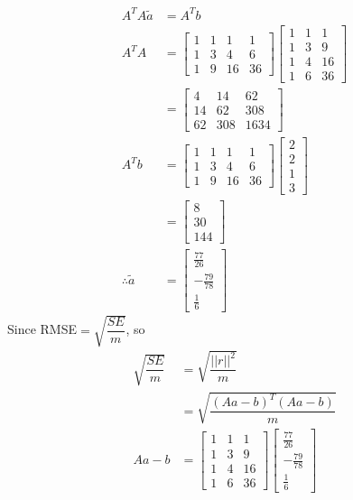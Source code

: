 \documentclass{article}
\begin{document}
\begin{enumerate}
\begin{align*}
A^TA\tilde{a}&=A^Tb\\
A^TA&=\begin{bmatrix}
1&1&1&1\\1&3&4&6\\1&9&16&36
\end{bmatrix}\begin{bmatrix}
1&1&1\\1&3&9\\1&4&16\\1&6&36
\end{bmatrix}\\
&=\begin{bmatrix}
4&14&62\\14&62&308\\62&308&1634
\end{bmatrix}\\
A^Tb&=\begin{bmatrix}
1&1&1&1\\1&3&4&6\\1&9&16&36
\end{bmatrix}\begin{bmatrix}
2\\2\\1\\3
\end{bmatrix}\\&=\begin{bmatrix}
8\\30\\144
\end{bmatrix}\\
\therefore \tilde{a}&=\begin{bmatrix}
\frac{77}{26}\\-\frac{79}{78}\\\frac{1}{6}
\end{bmatrix}
\end{align*}
Since RMSE$ = \sqrt{\dfrac{SE}{m}}$, so \begin{align*}
\sqrt{\dfrac{SE}{m}}&=\sqrt{\dfrac{||r||^2}{m}}\\
&=\sqrt{\dfrac{(Aa-b)^T(Aa-b)}{m}}\\
Aa-b&=\begin{bmatrix}
1&1&1\\1&3&9\\1&4&16\\1&6&36
\end{bmatrix}\begin{bmatrix}
\frac{77}{26}\\-\frac{79}{78}\\\frac{1}{6}

\end{bmatrix}
\end{align*}
\end{enumerate}
\end{document}
